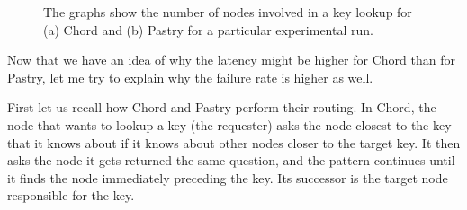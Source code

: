\begin{figure}[!htb]
  \centering
  \caption{The graphs show the number of nodes involved in a key lookup for (a) Chord and (b) Pastry for a particular experimental run.}
\end{figure}

\mbox{}
Now that we have an idea of why the latency might be higher for Chord than for Pastry, let me try to explain why the failure rate is higher as well.

First let us recall how Chord and Pastry perform their routing.
In Chord, the node that wants to lookup a key (the requester) asks the node closest to the key that it knows about if it knows about other nodes closer to the target key. It then asks the node it gets returned the same question, and the pattern continues until it finds the node immediately preceding the key. Its successor is the target node responsible for the key.

